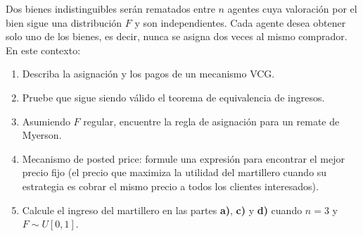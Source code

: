\documentclass[11pt, spanish]{article}
\theoremstyle{plain}
\begin{document}
\begin{itemize}
  Dos bienes indistinguibles serán rematados entre $n$ agentes cuya valoración por el bien sigue una distribución $F$ y son independientes. Cada agente desea obtener solo uno de los bienes, es decir, nunca se asigna dos veces al mismo comprador. En este contexto:
 \begin{enumerate} 
     \item Describa la asignación y los pagos de un mecanismo VCG.
     \item Pruebe que sigue siendo válido el teorema de equivalencia de ingresos.
     \item Asumiendo $F$ regular, encuentre la regla de asignación para un remate de Myerson.
     \item Mecanismo de posted price: formule una expresión para encontrar el mejor precio fijo (el precio que maximiza la utilidad del martillero cuando su estrategia es cobrar el mismo precio a todos los clientes interesados).
     \item Calcule el ingreso del martillero en las partes \textbf{a)}, \textbf{c)} y \textbf{d)} cuando $n=3$ y $F\sim U[0,1]$.
\end{enumerate}
 

\end{itemize}
\end{document}

